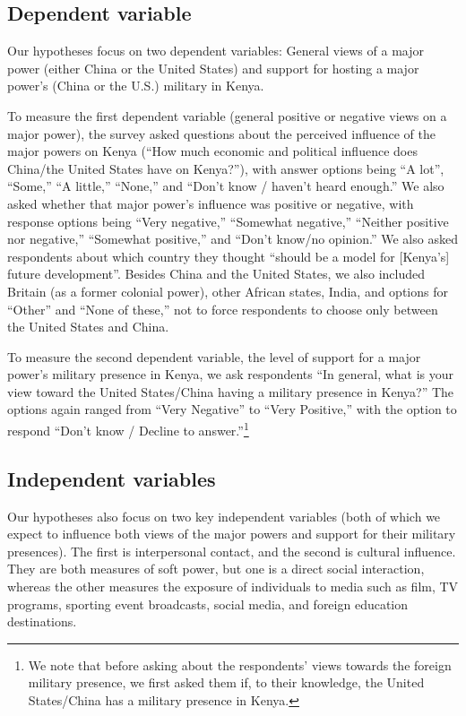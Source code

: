 \subsection*{Dependent variable} 

Our hypotheses focus on two dependent variables: General views of a major power (either China or the United States) and support for hosting a major power's (China or the U.S.) military in Kenya. 

To measure the first dependent variable (general positive or negative views on a major power), the survey asked questions about the perceived influence of the major powers on Kenya (``How much economic and political influence does China/the United States have on Kenya?''), with answer options being ``A lot'', ``Some,'' ``A little,'' ``None,'' and ``Don’t know / haven’t heard enough.'' We also asked whether that major power's influence was positive or negative, with response options being ``Very negative,'' ``Somewhat negative,'' ``Neither positive nor negative,'' ``Somewhat positive,'' and ``Don't know/no opinion.'' We also asked respondents about which country they thought ``should be a model for [Kenya's] future development''. Besides China and the United States, we also 
included Britain (as a former colonial power), other African states, India, and options for ``Other'' and ``None of these,'' not to force respondents to choose only between the United States and China.

To measure the second dependent variable, the level of support for a major power's military presence in Kenya, we ask respondents ``In general, what is your view toward the United States/China having a military presence in Kenya?'' The options again ranged from ``Very Negative'' to ``Very Positive,'' with the option to respond ``Don’t know / Decline to answer.''\footnote{We note that before asking about the respondents' views towards the foreign military presence, we first asked them if, to their knowledge, the United States/China has a military presence in Kenya.}  

\subsection*{Independent variables} 

Our hypotheses also focus on two key independent variables (both of which we expect to influence both views of the major powers and support for their military presences). The first is interpersonal contact, and the second is cultural influence. They are both measures of soft power, but one is a direct social interaction, whereas the other measures the exposure of individuals to media such as film, TV programs, sporting event broadcasts, social media, and foreign education destinations. 

